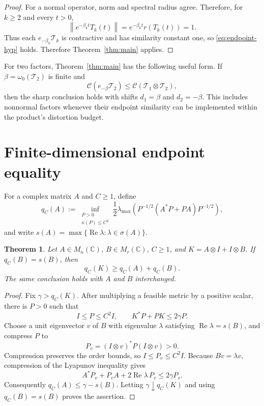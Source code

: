 \documentclass[11pt]{article}
\newtheorem{theorem}{Theorem}
\newcommand{\Csim}{\mathcal C}
\newcommand{\T}{\mathcal T}
\begin{document}
\begin{proof}
For a normal operator, norm and spectral radius agree.  Therefore, for
$k\geq2$ and every $t>0$,
\[
 \left\|e^{-\beta_k t}T_k(t)\right\|
 =e^{-\beta_k t}r(T_k(t))=1.
\]
Thus each $e_{-\beta_k}\T_k$ is contractive and has similarity constant one,
so \eqref{eq:endpoint-hyp} holds.  Therefore
Theorem~\ref{thm:main} applies.
\end{proof}

For two factors, Theorem~\ref{thm:main} has the following useful form.  If
$\beta=\omega_0(\T_2)$ is finite and
\[
  \Csim(e_{-\beta}\T_2)\leq \Csim(\T_1\otimes\T_2),
\]
then the sharp conclusion holds with shifts $d_1=\beta$ and
$d_2=-\beta$.  This includes nonnormal factors whenever their endpoint
similarity can be implemented within the product's distortion budget.

\section{Finite-dimensional endpoint equality}

For a complex matrix $A$ and $C\geq1$, define
\[
 q_C(A):=\inf_{\substack{P>0\\\kappa(P)\leq C^2}}
 \frac12\lambda_{\max}\!\left(
 P^{-1/2}(A^*P+PA)P^{-1/2}\right),
\]
and write $s(A)=\max\{\operatorname{Re}\lambda:\lambda\in\sigma(A)\}$.

\begin{theorem}\label{thm:matrix}
Let $A\in M_n(\mathbb C)$, $B\in M_r(\mathbb C)$, $C\geq1$, and
$K=A\otimes I+I\otimes B$.  If $q_C(B)=s(B)$, then
\[
  q_C(K)\geq q_C(A)+q_C(B).
\]
The same conclusion holds with $A$ and $B$ interchanged.
\end{theorem}

\begin{proof}
Fix $\gamma>q_C(K)$.  After multiplying a feasible metric by a positive
scalar, there is $P>0$ such that
\[
 I\leq P\leq C^2I,
 \qquad K^*P+PK\leq2\gamma P.
\]
Choose a unit eigenvector $v$ of $B$ with eigenvalue $\lambda$ satisfying
$\operatorname{Re}\lambda=s(B)$, and compress $P$ to
\[
 P_v=(I\otimes v)^*P(I\otimes v)>0.
\]
Compression preserves the order bounds, so
$I\leq P_v\leq C^2I$.  Because $Bv=\lambda v$, compression of the Lyapunov
inequality gives
\[
 A^*P_v+P_vA+2\operatorname{Re}\lambda\,P_v
 \leq2\gamma P_v.
\]
Consequently $q_C(A)\leq\gamma-s(B)$.  Letting
$\gamma\downarrow q_C(K)$ and using $q_C(B)=s(B)$ proves the assertion.
\end{proof}
\end{document}

